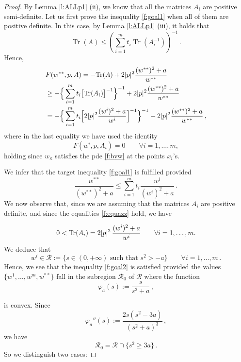 \documentclass[11pt]{amsart}
\theoremstyle{definition}
\theoremstyle{remark}
\def\k{\kappa}
\DeclareMathOperator{\Tr}{Tr}
\begin{document}
\begin{proof}
 
By Lemma \ref{l:ALLp1} (ii), we know that all the matrices $A_i$ are positive semi-definite.  
  Let us first prove the inequality \eqref{f:goal1} when  all of them are 
positive definite. 
In this case,  by Lemma \ref{l:ALLp1}  (iii),  it holds that
 $$\Tr(A) \leq 
\left(\sum_{i=1}^m t_i \Tr (A_i^{-1})\right)^{-1}\,. $$ 
 Hence,  $$\begin{aligned} 
& F (w^{**}, p, A )  
 =  - {\rm Tr} ( A)  +  2 |p| ^ 2 \frac{(w^{**} ) ^ 2 + a}{w ^ {**}}   \\ 
 & \geq   - \Big \{  \sum _ { i = 1} ^ m  t _i  \big [  {\rm Tr} (A _i )   \big ]   ^ { -1}   \Big \} ^ { -1}  
 + 2 |p| ^ 2 \frac{(w^{**} ) ^ 2 + a}{w ^ {**}}    \\ 
 & =   - \Big \{  \sum _ { i = 1} ^ m  t _i  
 \Big [  2 |p| ^ 2 \frac{(w^{i} ) ^ 2 + a}{w ^ {i}}   \Big ]      ^ { -1}   \Big \} ^ { -1}   + 2 |p| ^ 2 \frac{(w^{**} ) ^ 2 + a}{w ^ {**}}     \,,
   \end{aligned} 
 $$ 
 where in the last equality we have used the identity
  \begin{equation}\label{f:equazz} 
   F (w^i, p, A_i ) = 0 \qquad \forall i = 1, \dots, m, 
 \end{equation}
  holding since $w _\k $ satisfies the pde  \eqref{f:bvw}
 at the points $x _i$'s.   
 
 
 We infer that the target inequality \eqref{f:goal1} is fulfilled provided
 \begin{equation}\label{f:goal2} \frac{w^{**}}{(w^{**}) ^ 2  + a } 
 \leq \sum _ { i = 1} ^ m  t _i  
 \frac{w^i} { (w^{i} ) ^ 2  + a   }  \,.
 \end{equation} 
We now observe that, since we are assuming that the matrices $A_i$ are positive definite, and since
the equalities \eqref{f:equazz}  hold, we have 

 $$0 < {\rm Tr} ( A_i) = 2 |p | ^ 2 \, \frac {(w^ {i} ) ^ 2  + a  }{w^ i}   \qquad \forall i = 1, \dots, m.$$ 
 We deduce that 
 \begin{equation}\label{f:app} 
 w ^ i \in \mathcal R:=  \big \{  s \in (0,   + \infty)  \text{ such that } s ^ 2 > - a  \big \} \qquad \forall i = 1, \dots, m \,.
 \end{equation} Hence, we see that
the inequality \eqref{f:goal2} is satisfied provided  the values $\{w^ 1, \dots, w ^m, w ^{**}\}$ fall in the subregion $\mathcal R_0$ of $\mathcal R$ where the function 
 $$\varphi _ a ( s):= \frac{s}{ s ^ 2 + a  }\,,$$ 
 
is convex. 
 Since 
 $$\varphi _ a''  ( s):= \frac{2s (s^2- 3a)}{ (s ^ 2 + a ) ^ 3  } \,,$$ 
 we have
 $${\mathcal R}_0=  \mathcal R \cap \{ s^2 \geq 3 a \}  \,.$$ 
 So we distinguish two cases:
 

\end{proof}
\end{document}
